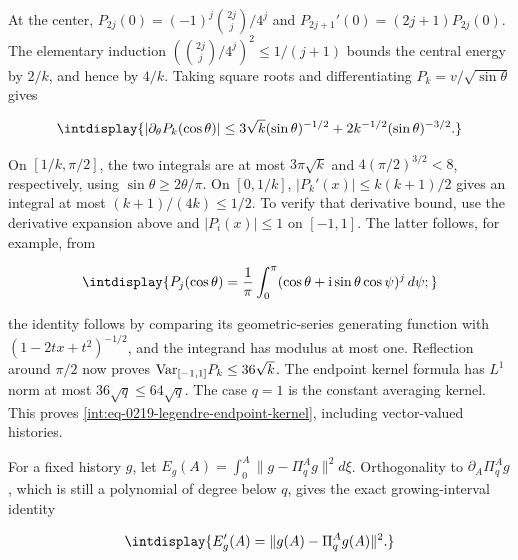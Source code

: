 
At the center, \(P_{2j}(0)=(-1)^j\binom{2j}{j}/4^j\) and \(P_{2j+1}'(0)=(2j+1)P_{2j}(0)\). The elementary induction \((\binom{2j}{j}/4^j)^2\le1/(j+1)\) bounds the central energy by \(2/k\), and hence by \(4/k\). Taking square roots and differentiating \(P_k=v/\sqrt{\sin\theta}\) gives


\begingroup\renewcommand{\theHequation}{intdisplay.517}
\begin{equation*}
\intdisplay{
|\partial_\theta P_k(\cos\theta)|
\le3\sqrt k(\sin\theta)^{-1/2}
+2k^{-1/2}(\sin\theta)^{-3/2}.
}
\end{equation*}
\endgroup


On \([1/k,\allowbreak \pi/2]\), the two integrals are at most \(3\pi\sqrt k\) and \(4(\pi/2)^{3/2}<8\), respectively, using \(\sin\theta\ge2\theta/\pi\). On \([0,\allowbreak 1/k]\), \(|P_k'(x)|\le k(k+1)/2\) gives an integral at most \((k+1)/(4k)\le1/2\). To verify that derivative bound, use the derivative expansion above and \(|P_i(x)|\le1\) on \([-1,\allowbreak 1]\). The latter follows, for example, from


\begingroup\renewcommand{\theHequation}{intdisplay.518}
\begin{equation*}
\intdisplay{
P_j(\cos\theta)=\frac1\pi\int_0^\pi
(\cos\theta+\mathrm i\sin\theta\cos\psi)^j\,d\psi;
}
\end{equation*}
\endgroup


the identity follows by comparing its geometric-series generating function with \((1-2tx+t^2)^{-1/2}\), and the integrand has modulus at most one. Reflection around \(\pi/2\) now proves \({\rm Var}_{[-1,\allowbreak 1]}P_k\le36\sqrt k\). The endpoint kernel formula has \(L^1\) norm at most \(36\sqrt q\le64\sqrt q\). The case \(q=1\) is the constant averaging kernel. This proves \eqref{int:eq-0219-legendre-endpoint-kernel}, including vector-valued histories.


For a fixed history \(g\), let \(E_g(A)=\int_0^A\|g-\Pi_q^Ag\|^2d\xi\). Orthogonality to \(\partial_A\Pi_q^Ag\), which is still a polynomial of degree below \(q\), gives the exact growing-interval identity


\begingroup\renewcommand{\theHequation}{intdisplay.519}
\begin{equation}
\intdisplay{
E_g'(A)=\|g(A)-\Pi_q^Ag(A)\|^2.
}
\label{int:eq-0220-legendre-growing-energy}
\end{equation}
\endgroup

